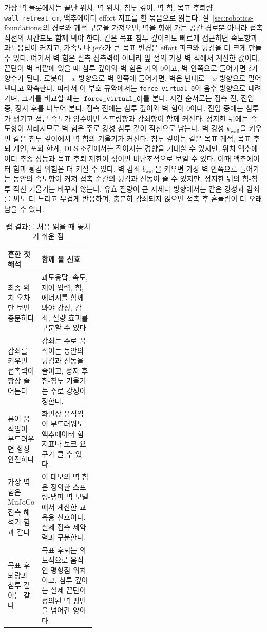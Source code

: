 가상 벽 플롯에서는 끝단 위치, 벽 위치, 침투 깊이, 벽 힘, 목표 후퇴량 \texttt{wall\_retreat\_cm}, 액추에이터 effort 지표를 한 묶음으로 읽는다.
절~\ref{sec:robotics-foundations}의 경로와 궤적 구분을 가져오면, 벽을 향해 가는 공간 경로뿐 아니라 접촉 직전의 시간표도 함께 봐야 한다.
같은 목표 침투 깊이라도 빠르게 접근하면 속도항과 과도응답이 커지고, 가속도나 jerk가 큰 목표 변경은 effort 피크와 튕김을 더 크게 만들 수 있다.
여기서 벽 힘은 실측 접촉력이 아니라 앞 절의 가상 벽 식에서 계산한 값이다.
끝단이 벽 바깥에 있을 때 침투 깊이와 벽 힘은 거의 0이고, 벽 안쪽으로 들어가면 $\delta$가 양수가 된다.
로봇이 $+x$ 방향으로 벽 안쪽에 들어가면, 벽은 반대로 $-x$ 방향으로 밀어낸다고 약속한다.
따라서 이 부호 규약에서는 \texttt{force\_virtual\_0}이 음수 방향으로 내려가며, 크기를 비교할 때는 \(\lvert\text{\texttt{force\_virtual\_0}}\rvert\)를 본다.
시간 순서로는 접촉 전, 진입 중, 정지 후를 나누어 본다.
접촉 전에는 침투 깊이와 벽 힘이 0이다.
진입 중에는 침투가 생기고 접근 속도가 양수이면 스프링항과 감쇠항이 함께 커진다.
정지한 뒤에는 속도항이 사라지므로 벽 힘은 주로 강성-침투 깊이 직선으로 남는다.
벽 강성 $k_{\mathrm{wall}}$을 키우면 같은 침투 깊이에서 벽 힘의 기울기가 커진다.
침투 깊이는 같은 목표 궤적, 목표 후퇴 게인, 포화 한계, DLS 조건에서는 작아지는 경향을 기대할 수 있지만, 위치 액추에이터 추종 성능과 목표 후퇴 제한이 섞이면 비단조적으로 보일 수 있다.
이때 액추에이터 힘과 튕김 위험은 더 커질 수 있다.
벽 감쇠 $b_{\mathrm{wall}}$을 키우면 가상 벽 안쪽으로 들어가는 동안의 속도항이 커져 접촉 순간의 튕김과 진동이 줄 수 있지만, 정지한 뒤의 힘-침투 직선 기울기는 바꾸지 않는다.
유효 질량이 큰 자세나 방향에서는 같은 강성과 감쇠를 써도 더 느리고 무겁게 반응하며, 충분히 감쇠되지 않으면 접촉 후 흔들림이 더 오래 남을 수 있다.

\begin{table}[!htbp]
  \centering
  \caption{랩 결과를 처음 읽을 때 놓치기 쉬운 점}
  \label{tab:lab-result-misreadings}
  \small
  \renewcommand{\arraystretch}{1.12}
  \begin{tabularx}{\linewidth}{@{}p{0.34\linewidth}X@{}}
    \toprule
    흔한 첫 해석 & 함께 볼 신호 \\
    \midrule
    최종 위치 오차만 보면 충분하다 & 과도응답, 속도, 제어 입력, 힘, 에너지를 함께 봐야 강성, 감쇠, 질량 효과를 구분할 수 있다. \\
    감쇠를 키우면 접촉력이 항상 줄어든다 & 감쇠는 주로 움직이는 동안의 튕김과 진동을 줄이고, 정지 후 힘-침투 기울기는 주로 강성이 정한다. \\
    뷰어 움직임이 부드러우면 항상 안전하다 & 화면상 움직임이 부드러워도 액추에이터 힘 지표나 토크 요구가 클 수 있다. \\
    가상 벽 힘은 MuJoCo 접촉 해석기 힘과 같다 & 이 데모의 벽 힘은 정의한 스프링-댐퍼 벽 모델에서 계산한 교육용 신호이다. 실제 접촉 제약력과 구분한다. \\
    목표 후퇴량과 침투 깊이는 같다 & 목표 후퇴는 의도적으로 움직인 평형점 위치이고, 침투 깊이는 실제 끝단이 정의된 벽 평면을 넘어간 양이다. \\
    \bottomrule
  \end{tabularx}
\end{table}

